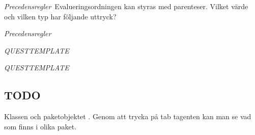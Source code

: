 \QUESTEND





\def\what{\emph{Precedensregler}}

\QUESTBEGIN

\Task \what~Evalueringsordningen kan styras med parenteser. Vilket värde och vilken typ har följande uttryck? 

\Subtask {}

\Subtask {}

\Subtask {}

\SOLUTION

\TaskSolved \what

\SubtaskSolved {}

\SubtaskSolved {}

\SubtaskSolved {}

\QUESTEND






\def\what{\emph{QUESTTEMPLATE}}

\QUESTBEGIN

\Task \what

\Subtask

\SOLUTION

\TaskSolved \what

\SubtaskSolved 

\QUESTEND




\subsection{TODO}



\ifPreSolution  %





\Task Klassen  och paketobjektet . %
Genom att trycka på tab tagenten kan man se vad som finns i olika paket.

